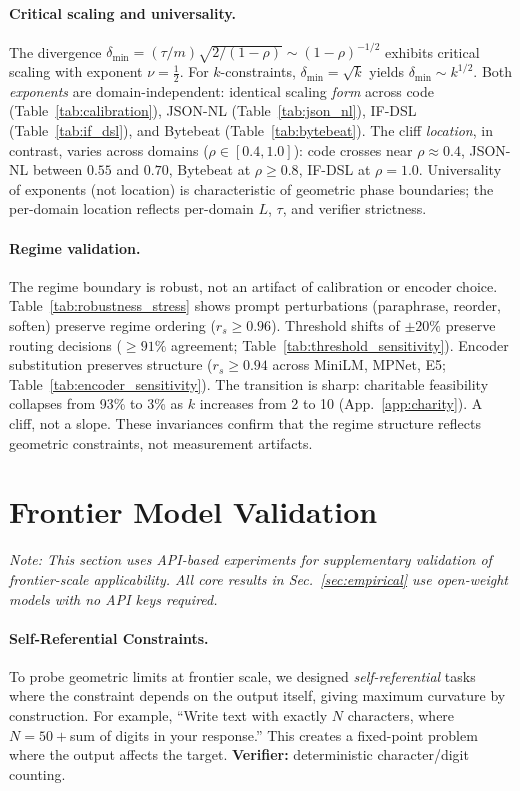 \documentclass{article}
\theoremstyle{plain}
\theoremstyle{definition}
\theoremstyle{remark}
\newcommand{\appref}[1]{App.~\ref{#1}}
\newcommand{\secref}[1]{Sec.~\ref{#1}}
\begin{document}
\paragraph{Critical scaling and universality.}
The divergence $\delta_{\min} = (\tau/m)\sqrt{2/(1-\rho)} \sim (1-\rho)^{-1/2}$ exhibits critical scaling with exponent $\nu = \tfrac{1}{2}$. For $k$-constraints, $\delta_{\min} = \sqrt{k}$ yields $\delta_{\min} \sim k^{1/2}$. Both \emph{exponents} are domain-independent: identical scaling \emph{form} across code (Table~\ref{tab:calibration}), JSON-NL (Table~\ref{tab:json_nl}), IF-DSL (Table~\ref{tab:if_dsl}), and Bytebeat (Table~\ref{tab:bytebeat}). The cliff \emph{location}, in contrast, varies across domains ($\rho \in [0.4, 1.0]$): code crosses near $\rho{\approx}0.4$, JSON-NL between $0.55$ and $0.70$, Bytebeat at $\rho \ge 0.8$, IF-DSL at $\rho{=}1.0$. Universality of exponents (not location) is characteristic of geometric phase boundaries; the per-domain location reflects per-domain $L$, $\tau$, and verifier strictness.

\paragraph{Regime validation.}
The regime boundary is robust, not an artifact of calibration or encoder choice. Table~\ref{tab:robustness_stress} shows prompt perturbations (paraphrase, reorder, soften) preserve regime ordering ($r_s \geq 0.96$). Threshold shifts of $\pm 20\%$ preserve routing decisions ($\geq 91\%$ agreement; Table~\ref{tab:threshold_sensitivity}). Encoder substitution preserves structure ($r_s \geq 0.94$ across MiniLM, MPNet, E5; Table~\ref{tab:encoder_sensitivity}). The transition is sharp: charitable feasibility collapses from 93\% to 3\% as $k$ increases from 2 to 10 (\appref{app:charity}). A cliff, not a slope. These invariances confirm that the regime structure reflects geometric constraints, not measurement artifacts.

\section{Frontier Model Validation}\label{app:claude_genome}\hypertarget{lim:scale}{}
\emph{Note: This section uses API-based experiments for supplementary validation of frontier-scale applicability. All core results in \secref{sec:empirical} use open-weight models with no API keys required.}

\paragraph{Self-Referential Constraints.}
To probe geometric limits at frontier scale, we designed \emph{self-referential} tasks where the constraint depends on the output itself, giving maximum curvature by construction. For example, ``Write text with exactly $N$ characters, where $N = 50 +{}$sum of digits in your response.'' This creates a fixed-point problem where the output affects the target. \textbf{Verifier:} deterministic character/digit counting.
\end{document}
